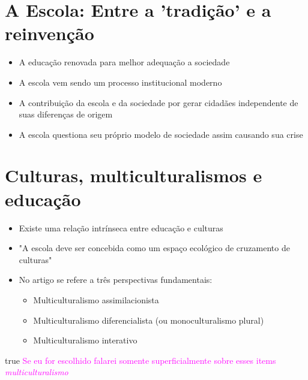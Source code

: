 \documentclass[]{beamer}
\newcommand{\obs}[1]{{
  \ifdefined\DRAFT
    \textcolor{magenta}{#1}
  \fi
}}
\def\DRAFT{true}
\begin{document}
  \section{A Escola: Entre a 'tradição' e a reinvenção}

  \begin{frame}{\secname *}
    \begin{itemize}
      \item
        A educação renovada para melhor adequação a sociedade

      \item
        A escola vem sendo um processo institucional moderno

      \item
        A contribuição da escola e da sociedade por gerar cidadães independente
        de suas diferenças de origem

      \item
        A escola questiona seu próprio modelo de sociedade assim causando sua
        crise
    \end{itemize}
  \end{frame}

  \section{Culturas, multiculturalismos e educação}

  \begin{frame}{\secname *}
    \begin{itemize}
      \item
        Existe uma relação intrínseca entre educação e culturas

      \item
        "A escola deve ser concebida como um espaço ecológico de cruzamento de
        culturas"

      \item
        No artigo se refere a três perspectivas fundamentais:
        \begin{itemize}
          \item
            Multiculturalismo assimilacionista

          \item
            Multiculturalismo diferencialista (ou monoculturalismo plural)
          \item Multiculturalismo interativo
        \end{itemize}
    \end{itemize}

    \obs{
      Se eu for escolhido falarei somente superficialmente sobre esses items
      \emph{multiculturalismo}
    }
  \end{frame}
\end{document}
